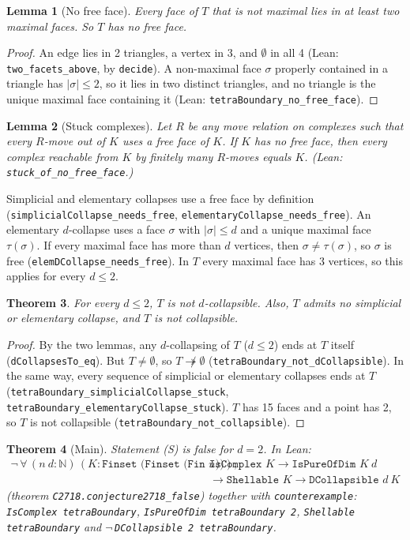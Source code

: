 \documentclass[11pt]{article}
\newtheorem{theorem}{Theorem}
\newtheorem{lemma}[theorem]{Lemma}
\theoremstyle{definition}
\begin{document}
\begin{lemma}[No free face]
Every face of $T$ that is not maximal lies in at least two maximal faces. So $T$ has no free face.
\end{lemma}
\begin{proof}
An edge lies in 2 triangles, a vertex in 3, and $\emptyset$ in all 4 (Lean:
\texttt{two\_facets\_above}, by \texttt{decide}). A non-maximal face $\sigma$ properly contained in a
triangle has $|\sigma|\le 2$, so it lies in two distinct triangles, and no triangle is the unique
maximal face containing it (Lean: \texttt{tetraBoundary\_no\_free\_face}).
\end{proof}

\begin{lemma}[Stuck complexes]
Let $R$ be any move relation on complexes such that every $R$-move out of $K$ uses a free face of
$K$. If $K$ has no free face, then every complex reachable from $K$ by finitely many $R$-moves equals
$K$. (Lean: \texttt{stuck\_of\_no\_free\_face}.)
\end{lemma}

Simplicial and elementary collapses use a free face by definition
(\texttt{simplicialCollapse\_needs\_free}, \texttt{elementaryCollapse\_needs\_free}). An elementary
$d$-collapse uses a face $\sigma$ with $|\sigma|\le d$ and a unique maximal face $\tau(\sigma)$.
If every maximal face has more than $d$ vertices, then $\sigma\ne\tau(\sigma)$, so $\sigma$ is free
(\texttt{elemDCollapse\_needs\_free}). In $T$ every maximal face has 3 vertices, so this applies for
every $d\le 2$.

\begin{theorem}
For every $d\le 2$, $T$ is not $d$-collapsible. Also, $T$ admits no simplicial or elementary
collapse, and $T$ is not collapsible.
\end{theorem}
\begin{proof}
By the two lemmas, any $d$-collapsing of $T$ ($d\le 2$) ends at $T$ itself
(\texttt{dCollapsesTo\_eq}). But $T\ne\emptyset$, so $T\not\twoheadrightarrow\emptyset$
(\texttt{tetraBoundary\_not\_dCollapsible}). In the same way, every sequence of simplicial or
elementary collapses ends at $T$ (\texttt{tetraBoundary\_simplicialCollapse\_stuck},
\texttt{tetraBoundary\_elementaryCollapse\_stuck}). $T$ has 15 faces and a point has 2, so $T$ is not
collapsible (\texttt{tetraBoundary\_not\_collapsible}).
\end{proof}

\begin{theorem}[Main]
Statement (S) is false for $d=2$. In Lean:
\[
  \begin{aligned}
  \neg\,\forall\,(n\ d:\mathbb{N})\,(K:\texttt{Finset (Finset (Fin }n\texttt{))}),\quad
  &\texttt{IsComplex }K\to\texttt{IsPureOfDim }K\ d\\
  &\to\texttt{Shellable }K\to\texttt{DCollapsible }d\ K
  \end{aligned}
\]
(theorem \texttt{C2718.conjecture2718\_false})
together with \texttt{counterexample}: \texttt{IsComplex tetraBoundary},
\texttt{IsPureOfDim tetraBoundary 2}, \texttt{Shellable tetraBoundary} and
$\neg$\,\texttt{DCollapsible 2 tetraBoundary}.
\end{theorem}
\end{document}
